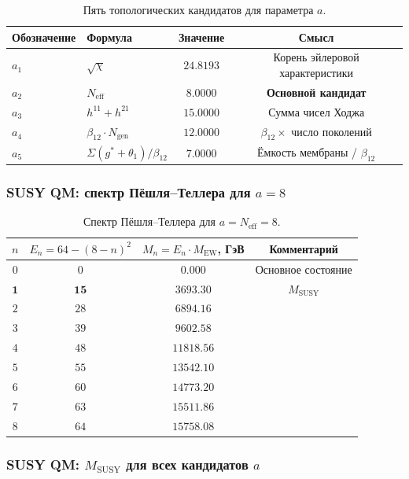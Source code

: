 \documentclass[11pt,a4paper]{article}
\theoremstyle{definition}
\begin{document}
\begin{table}[ht]
\centering
\caption{Пять топологических кандидатов для параметра \texorpdfstring{$a$}{a}.}
\label{tab:app-five-a}
\begin{tabular}{llcc}
\toprule
Обозначение & Формула & Значение & Смысл \\
\midrule
$a_1$ & $\sqrt{\chi}$ & $24.8193$ & Корень эйлеровой характеристики \\
$a_2$ & $N_{\text{eff}}$ & $8.0000$ & \textbf{Основной кандидат} \\
$a_3$ & $h^{11} + h^{21}$ & $15.0000$ & Сумма чисел Ходжа \\
$a_4$ & $\beta_{12} \cdot N_{\text{gen}}$ & $12.0000$ & $\beta_{12} \times$ число поколений \\
$a_5$ & $\Sigma(g^*+\theta_1)/\beta_{12}$ & $7.0000$ & Ёмкость мембраны / $\beta_{12}$ \\
\bottomrule
\end{tabular}
\end{table}

\subsubsection{SUSY QM: спектр Пёшля--Теллера для \texorpdfstring{$a = 8$}{a = 8}}

\begin{table}[ht]
\centering
\caption{Спектр Пёшля--Теллера для $a = N_{\text{eff}} = 8$.}
\label{tab:app-susy-spectrum}
\begin{tabular}{cccc}
\toprule
$n$ & $E_n = 64 - (8-n)^2$ & $M_n = E_n \cdot M_{\text{EW}}$, ГэВ & Комментарий \\
\midrule
$0$ & $0$ & $0.000$ & Основное состояние \\
$\mathbf{1}$ & $\mathbf{15}$ & $\mathbf{3693.30}$ & $M_{\text{SUSY}}$ \\
$2$ & $28$ & $6894.16$ & \\
$3$ & $39$ & $9602.58$ & \\
$4$ & $48$ & $11818.56$ & \\
$5$ & $55$ & $13542.10$ & \\
$6$ & $60$ & $14773.20$ & \\
$7$ & $63$ & $15511.86$ & \\
$8$ & $64$ & $15758.08$ & \\
\bottomrule
\end{tabular}
\end{table}

\subsubsection{SUSY QM: \texorpdfstring{$M_{\text{SUSY}}$}{M\_SUSY} для всех кандидатов \texorpdfstring{$a$}{a}}
\end{document}
